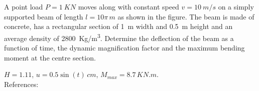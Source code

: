 
\begin{Exercise}[label={moving_load}]
A point load $P=\SI{1}{KN}$ moves along with constant speed $v=\SI{10}{m/s}$ on a simply supported beam of length $l=10\pi\,\si{m}$ as shown in the figure. The beam is made of concrete, has a rectangular section of \SI{1}{m} width and \SI{0.5}{m} height and an average density of \SI{2800}{Kg/m^3}. Determine the deflection of the beam as a function of time, the dynamic magnification factor and the maximum bending moment at the centre section.

\begin{center}
\end{center}

\shortAnswer $H=1.11$, $u=0.5\sin(t)\,\si{cm}$, $M_{max} = 8.7\,\si{KN.m}$. \\
References: \cite[page 305]{chopra}
\end{Exercise}



